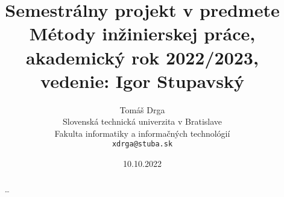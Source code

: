 \documentclass[10pt,twoside,slovak,a4paper]{article}
\title{Semestrálny projekt v predmete Métody inžinierskej práce, akademický rok 2022/2023, vedenie: Igor Stupavský}
\author{Tomáš Drga\\[2pt]
	{\small Slovenská technická univerzita v Bratislave}\\
	{\small Fakulta informatiky a informačných technológií}\\
	{\small \texttt{xdrga@stuba.sk}}
	}
\date{\small 10.10.2022}
\begin{document}
\maketitle

\begin{abstract}
\ldots
\end{abstract}
\end{document}

